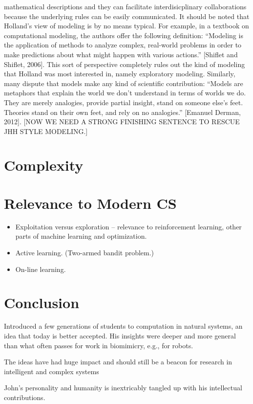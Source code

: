 \documentclass{sig-alternate}
\begin{document}
mathematical descriptions and they can facilitate interdisicplinary
collaborations because the underlying rules can be easily
communicated.  It should be noted that Holland's view of modeling is
by no means typical.  For example, in a textbook on computational
modeling, the authors offer the following definition: “Modeling is the
application of methods to analyze complex, real-world problems in
order to make predictions about what might happen with various
actions.” [Shiflet and Shiflet, 2006].  This sort of perspective
completely rules out the kind of modeling that Holland was most
interested in, namely exploratory modeling.  Similarly, many dispute
that models make any kind of scientific contribution: “Models are
metaphors that explain the world we don’t understand in terms of
worlds we do.  They are merely analogies, provide partial insight,
stand on someone else’s feet.  Theories stand on their own feet, and
rely on no analogies.”  [Emanuel Derman, 2012].  [NOW WE NEED A STRONG
  FINISHING SENTENCE TO RESCUE JHH STYLE MODELING.]

\section{Complexity}

\section{Relevance to Modern CS}

\begin{itemize}
\item Exploitation versus exploration -- relevance to reinforcement
  learning, other parts of machine learning and optimization.
\item Active learning.  (Two-armed bandit problem.) 
\item On-line learning.  
\end{itemize}

\section{Conclusion}

Introduced a few generations of students to computation in natural systems, an idea that today is better accepted.  His insights were deeper and more general than what often passes for work in biomimicry, e.g., for robots.

The ideas have had huge impact and should still be a beacon for research in intelligent and complex systems

John's personality and humanity is inextricably tangled up with his intellectual contributions.
\end{document}
